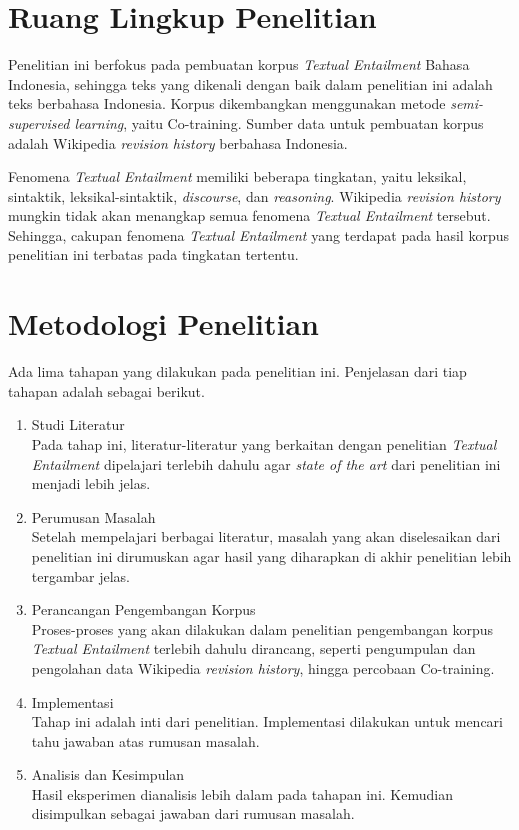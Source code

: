 \section{Ruang Lingkup Penelitian}
Penelitian ini berfokus pada pembuatan korpus \textit{Textual Entailment} Bahasa Indonesia, sehingga teks yang dikenali dengan baik dalam penelitian ini adalah teks berbahasa Indonesia. Korpus dikembangkan menggunakan metode \textit{semi-supervised learning}, yaitu Co-training. Sumber data untuk pembuatan korpus adalah Wikipedia \textit{revision history} berbahasa Indonesia.

Fenomena \textit{Textual Entailment} memiliki beberapa tingkatan, yaitu leksikal, sintaktik, leksikal-sintaktik, \textit{discourse}, dan \textit{reasoning}. Wikipedia \textit{revision history} mungkin tidak akan menangkap semua fenomena \textit{Textual Entailment} tersebut. Sehingga, cakupan fenomena \textit{Textual Entailment} yang terdapat pada hasil korpus penelitian ini terbatas pada tingkatan tertentu.

\section{Metodologi Penelitian}
Ada lima tahapan yang dilakukan pada penelitian ini. Penjelasan dari tiap tahapan adalah sebagai berikut.
\begin{enumerate}
	\item Studi Literatur \\
	Pada tahap ini, literatur-literatur yang berkaitan dengan penelitian \textit{Textual Entailment} dipelajari terlebih dahulu agar \textit{state of the art} dari penelitian ini menjadi lebih jelas.
	\item Perumusan Masalah \\
	Setelah mempelajari berbagai literatur, masalah yang akan diselesaikan dari penelitian ini dirumuskan agar hasil yang diharapkan di akhir penelitian lebih tergambar jelas. 
	\item Perancangan Pengembangan Korpus\\
	Proses-proses yang akan dilakukan dalam penelitian pengembangan korpus \textit{Textual Entailment} terlebih dahulu dirancang, seperti pengumpulan dan pengolahan data Wikipedia \textit{revision history}, hingga percobaan Co-training.
	\item Implementasi  \\
	Tahap ini adalah inti dari penelitian. Implementasi dilakukan untuk mencari tahu jawaban atas rumusan masalah. 
	\item Analisis dan Kesimpulan \\
	Hasil eksperimen dianalisis lebih dalam pada tahapan ini. Kemudian disimpulkan sebagai jawaban dari rumusan masalah.
\end{enumerate}


